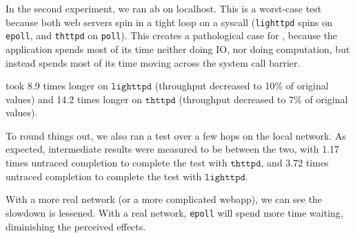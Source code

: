 In the second experiment, we ran ab on localhost.  This is a
worst-case test because both web servers spin in a tight loop on a
syscall (\texttt{lighttpd} spins on \texttt{epoll}, and
\texttt{thttpd} on \texttt{poll}). 
This creates a pathological case for \tachyon, because the application
spends most of its time neither doing IO, nor doing computation, but
instead spends most of its time moving across the system call barrier.

\tachyon
took 8.9 times longer on $\texttt{lighttpd}$ (throughput decreased to
10\% of original values) and 14.2 times longer on $\texttt{thttpd}$
(throughput decreased to 7\% of original values).

To round things out, we also ran a test over a few hops on the local network.
As expected, intermediate results were measured to be between the two, with
1.17 times untraced completion to complete the test with $\texttt{thttpd}$, and 3.72
times untraced completion to complete the test with $\texttt{lighttpd}$.

With a more real network (or a more complicated webapp), we can see the
slowdown is lessened. With a real network, \texttt{epoll} will spend more
time waiting, diminishing the perceived effects.




